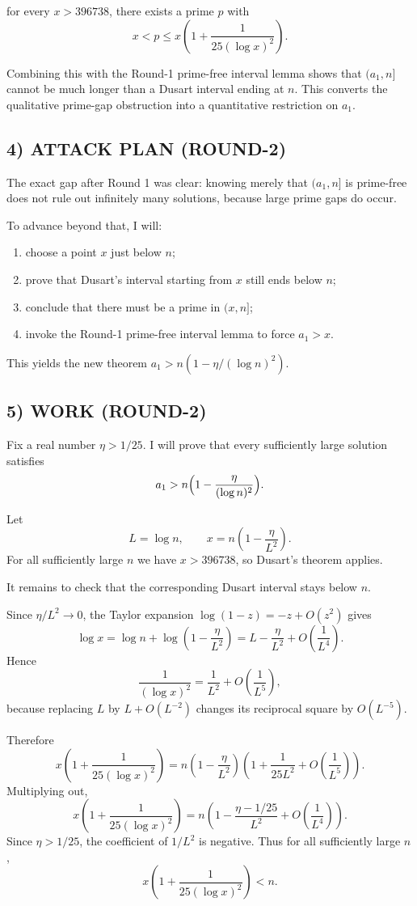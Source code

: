 for every $x>396738$, there exists a prime $p$ with
\[
x<p\leq x\left(1+\frac{1}{25(\log x)^{2}}\right).
\]

Combining this with the Round-1 prime-free interval lemma shows that $(a_{1},n]$ cannot be much longer than a Dusart interval ending at $n$. This converts the qualitative prime-gap obstruction into a quantitative restriction on $a_{1}$.

\subsection*{4) ATTACK PLAN (ROUND-2)}
The exact gap after Round 1 was clear: knowing merely that $(a_{1},n]$ is prime-free does not rule out infinitely many solutions, because large prime gaps do occur.

To advance beyond that, I will:
\begin{enumerate}
\item choose a point $x$ just below $n$;
\item prove that Dusart's interval starting from $x$ still ends below $n$;
\item conclude that there must be a prime in $(x,n]$;
\item invoke the Round-1 prime-free interval lemma to force $a_{1}>x$.
\end{enumerate}
This yields the new theorem $a_{1}>n(1-\eta/(\log n)^{2})$.

\subsection*{5) WORK (ROUND-2)}
Fix a real number $\eta>1/25$. I will prove that every sufficiently large solution satisfies
\[
a_{1}>n\Bigl(1-\frac{\eta}{(\log n)^{2}}\Bigr).
\]

Let
\[
L=\log n,
\qquad
x=n\left(1-\frac{\eta}{L^{2}}\right).
\]
For all sufficiently large $n$ we have $x>396738$, so Dusart's theorem applies.

It remains to check that the corresponding Dusart interval stays below $n$.

Since $\eta/L^{2}\to 0$, the Taylor expansion $\log(1-z)=-z+O(z^{2})$ gives
\[
\log x
=\log n+\log\left(1-\frac{\eta}{L^{2}}\right)
=L-\frac{\eta}{L^{2}}+O\!\left(\frac{1}{L^{4}}\right).
\]
Hence
\[
\frac{1}{(\log x)^{2}}
=\frac{1}{L^{2}}+O\!\left(\frac{1}{L^{5}}\right),
\]
because replacing $L$ by $L+O(L^{-2})$ changes its reciprocal square by $O(L^{-5})$.

Therefore
\[
x\left(1+\frac{1}{25(\log x)^{2}}\right)
=n\left(1-\frac{\eta}{L^{2}}\right)
\left(1+\frac{1}{25L^{2}}+O\!\left(\frac{1}{L^{5}}\right)\right).
\]
Multiplying out,
\[
x\left(1+\frac{1}{25(\log x)^{2}}\right)
=n\left(1-\frac{\eta-1/25}{L^{2}}+O\!\left(\frac{1}{L^{4}}\right)\right).
\]
Since $\eta>1/25$, the coefficient of $1/L^{2}$ is negative. Thus for all sufficiently large $n$,
\[
x\left(1+\frac{1}{25(\log x)^{2}}\right)<n.
\]

